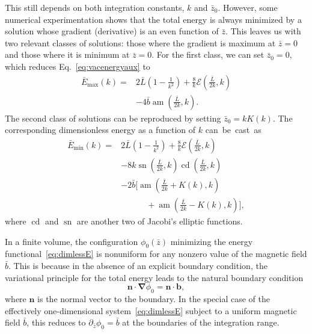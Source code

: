 \documentclass[pdflatex,iicol,sn-mathphys-num]{sn-jnl}
\let\p=\phi
\let\de=\partial
\DeclareMathOperator{\am}{am}%
\DeclareMathOperator{\cd}{cd}%
\DeclareMathOperator{\sn}{sn}%
\newcommand{\vek}[1]{\bm{#1}}%
\newcommand{\grad}{\vek\nabla}%
\newcommand{\bmag}{b}%
\begin{document}
This still depends on both integration constants, $k$ and $\bar z_0$. However, some numerical experimentation shows that the total energy is always minimized by a solution whose gradient (derivative) is an even function of $\bar z$. This leaves us with two relevant classes of solutions: those where the gradient is maximum at $\bar z=0$ and those where it is minimum at $\bar z=0$. For the first class, we can set $\bar z_0=0$, which reduces Eq.~\eqref{eq:vacenergyaux} to
\begin{equation}
\begin{split}
\bar E_\text{max}(k)={}&2\bar L\left(1-\frac1{k^2}\right)+\frac8k\mathcal E(\tfrac{\bar L}{2k},k)\\
&-4\bar\bmag\am(\tfrac{\bar L}{2k},k).
\end{split}
\label{eq:vacenergymax}
\end{equation}
The second class of solutions can be reproduced by setting $\bar z_0=kK(k)$. The corresponding dimensionless energy as a function of $k$ can~be~cast~as
\begin{equation}
\begin{split}
\bar E_\text{min}(k)={}&2\bar L\left(1-\frac1{k^2}\right)+\frac8k\mathcal E(\tfrac{\bar L}{2k},k)\\
&-8k\sn(\tfrac{\bar L}{2k},k)\cd(\tfrac{\bar L}{2k},k)\\
&-2\bar\bmag\bigl[\am(\tfrac{\bar L}{2k}+K(k),k)\\
&\qquad\quad+\am(\tfrac{\bar L}{2k}-K(k),k)\bigr],
\end{split}
\label{eq:vacenergymin}
\end{equation}
where $\cd$ and $\sn$ are another two of Jacobi's elliptic functions.

In a finite volume, the configuration $\p_0(\bar z)$ minimizing the energy functional~\eqref{eq:dimlessE} is nonuniform for any nonzero value of the magnetic field $\bar\bmag$. This is because in the absence of an explicit boundary condition, the variational principle for the total energy leads to the natural boundary condition
\begin{equation}
\vek n\cdot\grad\p_0=\vek n\cdot\vek\bmag,
\label{eq:naturalBC}
\end{equation}
where $\vek n$ is the normal vector to the boundary. In the special case of the effectively one-dimensional system~\eqref{eq:dimlessE} subject to a uniform magnetic field $\bar\bmag$, this reduces to $\de_{\bar z}\p_0=\bar\bmag$ at the boundaries of the integration range. 
\end{document}
